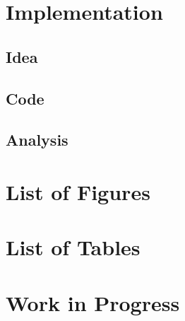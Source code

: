 \documentclass[12pt,a4paper,titlepage,xcolor=dvipsnames,bibliography=totoc, listof=totoc]{scrartcl}
\theoremstyle{definition}
\begin{document}
\section{Implementation}
\subsection{Idea} %
\subsection{Code}
\subsection{Analysis}




\section{List of Figures}

\section{List of Tables}

\newpage 
\section{Work in Progress}










\label{End Document}
\end{document}
